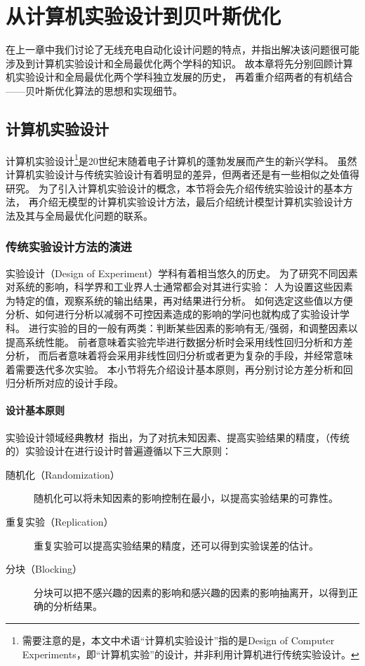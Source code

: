 \documentclass[index]{subfiles}
\begin{document}
\chapter{从计算机实验设计到贝叶斯优化}\label{sec:doebgo}
在上一章中我们讨论了无线充电自动化设计问题的特点，并指出解决该问题很可能涉及到计算机实验设计和全局最优化两个学科的知识。
故本章将先分别回顾计算机实验设计和全局最优化两个学科独立发展的历史，
再着重介绍两者的有机结合——贝叶斯优化算法的思想和实现细节。

\section{计算机实验设计}\label{sec:doe}
计算机实验设计\footnote{需要注意的是，本文中术语“计算机实验设计”指的是Design of Computer Experiments，即“计算机实验”的设计，并非利用计算机进行传统实验设计。}是20世纪末随着电子计算机的蓬勃发展而产生的新兴学科\cite{mckay1979}。
虽然计算机实验设计与传统实验设计有着明显的差异，但两者还是有一些相似之处值得研究。
为了引入计算机实验设计的概念，本节将会先介绍传统实验设计的基本方法，
再介绍无模型的计算机实验设计方法，最后介绍统计模型计算机实验设计方法及其与全局最优化问题的联系。

\subsection{传统实验设计方法的演进}
实验设计（Design of Experiment）学科有着相当悠久的历史。
为了研究不同因素对系统的影响，科学界和工业界人士通常都会对其进行实验：
人为设置这些因素为特定的值，观察系统的输出结果，再对结果进行分析。
如何选定这些值以方便分析、如何进行分析以减弱不可控因素造成的影响的学问也就构成了实验设计学科\cite{montgomery}。
进行实验的目的一般有两类：判断某些因素的影响有无/强弱，和调整因素以提高系统性能。
前者意味着实验完毕进行数据分析时会采用线性回归分析和方差分析，
而后者意味着将会采用非线性回归分析或者更为复杂的手段，并经常意味着需要迭代多次实验。
本小节将先介绍设计基本原则，再分别讨论方差分析和回归分析所对应的设计手段。

\subsubsection{设计基本原则}
实验设计领域经典教材~指出，为了对抗未知因素、提高实验结果的精度，（传统的）实验设计在进行设计时普遍遵循以下三大原则：
\begin{description}
  \item[随机化（Randomization）] 随机化可以将未知因素的影响控制在最小，以提高实验结果的可靠性。
  \item[重复实验（Replication）] 重复实验可以提高实验结果的精度，还可以得到实验误差的估计。
  \item[分块（Blocking）] 分块可以把不感兴趣的因素的影响和感兴趣的因素的影响抽离开，以得到正确的分析结果。
\end{description}
\end{document}
